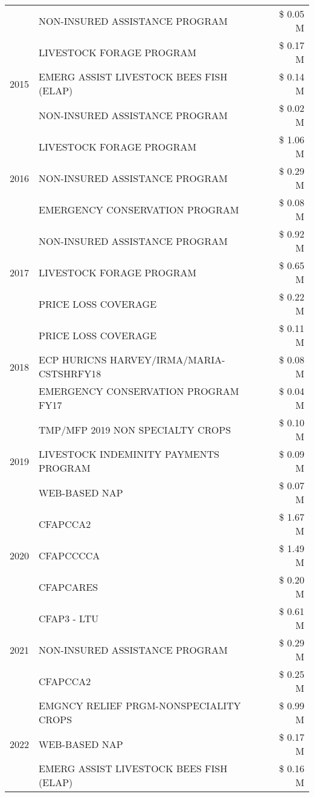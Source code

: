 \begin{tabular}{llr}
 & NON-INSURED ASSISTANCE PROGRAM & \$ 0.05 M \\
\cline{1-3}
\multirow[t]{3}{*}{2015} & LIVESTOCK FORAGE PROGRAM & \$ 0.17 M \\
 & EMERG ASSIST LIVESTOCK BEES FISH (ELAP) & \$ 0.14 M \\
 & NON-INSURED ASSISTANCE PROGRAM & \$ 0.02 M \\
\cline{1-3}
\multirow[t]{3}{*}{2016} & LIVESTOCK FORAGE PROGRAM & \$ 1.06 M \\
 & NON-INSURED ASSISTANCE PROGRAM & \$ 0.29 M \\
 & EMERGENCY CONSERVATION PROGRAM & \$ 0.08 M \\
\cline{1-3}
\multirow[t]{3}{*}{2017} & NON-INSURED ASSISTANCE PROGRAM & \$ 0.92 M \\
 & LIVESTOCK FORAGE PROGRAM & \$ 0.65 M \\
 & PRICE LOSS COVERAGE & \$ 0.22 M \\
\cline{1-3}
\multirow[t]{3}{*}{2018} & PRICE LOSS COVERAGE & \$ 0.11 M \\
 & ECP HURICNS HARVEY/IRMA/MARIA-CSTSHRFY18 & \$ 0.08 M \\
 & EMERGENCY CONSERVATION PROGRAM FY17 & \$ 0.04 M \\
\cline{1-3}
\multirow[t]{3}{*}{2019} & TMP/MFP 2019 NON SPECIALTY CROPS & \$ 0.10 M \\
 & LIVESTOCK INDEMINITY PAYMENTS PROGRAM & \$ 0.09 M \\
 & WEB-BASED NAP & \$ 0.07 M \\
\cline{1-3}
\multirow[t]{3}{*}{2020} & CFAPCCA2 & \$ 1.67 M \\
 & CFAPCCCCA & \$ 1.49 M \\
 & CFAPCARES & \$ 0.20 M \\
\cline{1-3}
\multirow[t]{3}{*}{2021} & CFAP3 - LTU & \$ 0.61 M \\
 & NON-INSURED ASSISTANCE PROGRAM & \$ 0.29 M \\
 & CFAPCCA2 & \$ 0.25 M \\
\cline{1-3}
\multirow[t]{3}{*}{2022} & EMGNCY RELIEF PRGM-NONSPECIALITY CROPS & \$ 0.99 M \\
 & WEB-BASED NAP & \$ 0.17 M \\
 & EMERG ASSIST LIVESTOCK BEES FISH (ELAP) & \$ 0.16 M \\
\cline{1-3}
\bottomrule
\end{tabular}
